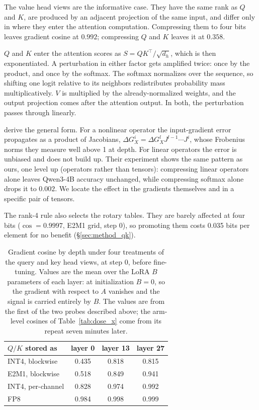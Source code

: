 \documentclass[11pt,letterpaper]{article}
\begin{document}
The value head views are the informative case. They have the same rank as $Q$ and $K$, are produced by an adjacent projection of the same input, and differ only in where they enter the attention computation. Compressing them to four bits leaves gradient cosine at $0.992$; compressing $Q$ and $K$ leaves it at $0.358$.

$Q$ and $K$ enter the attention scores as $S = QK^\top/\sqrt{d_h}$, which is then exponentiated. A perturbation in either factor gets amplified twice: once by the product, and once by the softmax. The softmax normalizes over the sequence, so shifting one logit relative to its neighbors redistributes probability mass multiplicatively. $V$ is multiplied by the already-normalized weights, and the output projection comes after the attention output. In both, the perturbation passes through linearly.

\citet{actcomp2026} derive the general form. For a nonlinear operator the input-gradient error propagates as a product of Jacobians, $\Delta G_X^i = \Delta G_X^l J^{l-1} \cdots J^i$, whose Frobenius norms they measure well above 1 at depth. For linear operators the error is unbiased and does not build up. Their experiment shows the same pattern as ours, one level up (operators rather than tensors): compressing linear operators alone leaves Qwen3-4B accuracy unchanged, while compressing softmax alone drops it to $0.002$. We locate the effect in the gradients themselves and in a specific pair of tensors.

The rank-4 rule also selects the rotary tables. They are barely affected at four bits ($\cos = 0.9997$, E2M1 grid, step 0), so promoting them costs 0.035 bits per element for no benefit (\S\ref{sec:method_qk}). 

\begin{table}[htbp]
\centering
\small
\caption{Gradient cosine by depth under four treatments of the query and key head views, at step 0, before fine-tuning. Values are the mean over the LoRA $B$ parameters of each layer: at initialization $B = 0$, so the gradient with respect to $A$ vanishes and the signal is carried entirely by $B$. The values are from the first of the two probes described above; the arm-level cosines of Table~\ref{tab:dose_x} come from its repeat seven minutes later.}
\label{tab:layerdepth}
\begin{tabular}{lccc}
\toprule
$Q/K$ stored as & layer 0 & layer 13 & layer 27 \\
\midrule
INT4, blockwise        & 0.435 & 0.818 & 0.815 \\
E2M1, blockwise        & 0.518 & 0.849 & 0.941 \\
INT4, per-channel      & 0.828 & 0.974 & 0.992 \\
FP8                    & 0.984 & 0.998 & 0.999 \\
\bottomrule
\end{tabular}
\end{table}
\end{document}
